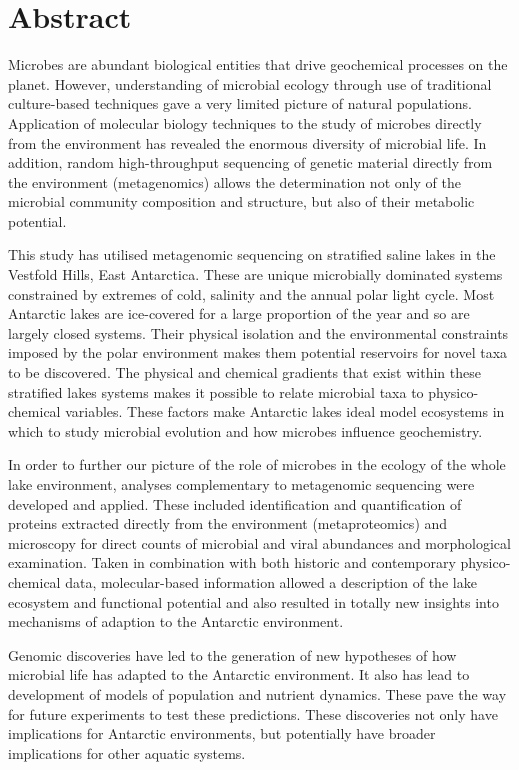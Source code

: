 \chapter*{Abstract}
Microbes are abundant biological entities that drive geochemical processes on the planet.
However, understanding of microbial ecology through use of traditional culture-based techniques gave a very limited picture of natural populations.
Application of molecular biology techniques to the study of microbes directly from the environment has revealed the enormous diversity of microbial life.
In addition, random high-throughput sequencing of genetic material directly from the environment (metagenomics) allows the determination not only of the microbial community composition and structure, but also of their metabolic potential.

This study has utilised metagenomic sequencing on stratified saline lakes in the Vestfold Hills, East Antarctica.
These are unique microbially dominated systems constrained by extremes of cold, salinity and the annual polar light cycle.
Most Antarctic lakes are ice-covered for a large proportion of the year and so are largely closed systems.
Their physical isolation and the environmental constraints imposed by the polar environment makes them potential reservoirs for novel taxa to be discovered.
The physical and chemical gradients that exist within these stratified lakes systems makes it possible to relate microbial taxa to physico-chemical variables.
These factors make Antarctic lakes ideal model ecosystems in which to study microbial evolution and how microbes influence geochemistry.

In order to further our picture of the role of microbes in the ecology of the whole lake environment, analyses complementary to metagenomic sequencing were developed and applied.
These included identification and quantification of proteins extracted directly from the environment (metaproteomics) and microscopy for direct counts of microbial and viral abundances and morphological examination.
Taken in combination with both historic and contemporary physico-chemical data, molecular-based information allowed a description of the lake ecosystem and functional potential and also resulted in totally new insights into mechanisms of adaption to the Antarctic environment.

Genomic discoveries have led to the generation of new hypotheses of how microbial life has adapted to the Antarctic environment.
It also has lead to development of models of population and nutrient dynamics.
These pave the way for future experiments to test these predictions.
These discoveries not only have implications for Antarctic environments, but potentially have broader implications for other aquatic systems.





